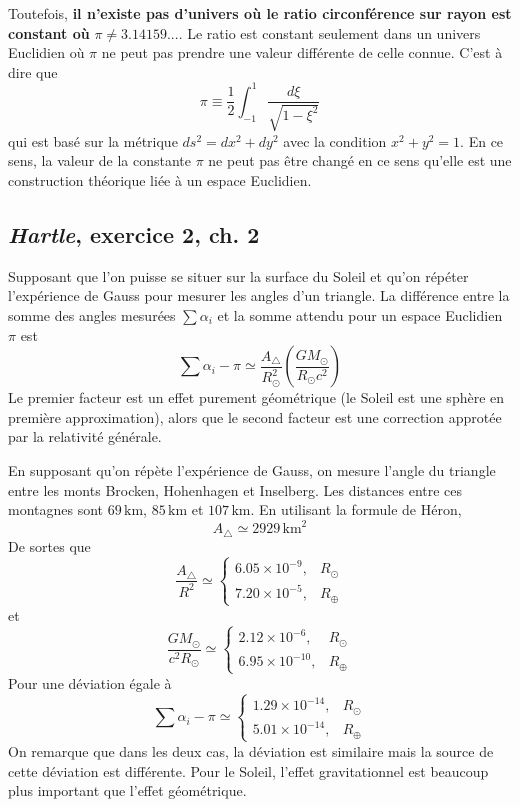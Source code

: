 \documentclass{article}
\numberwithin{equation}{section}
\begin{document}
Toutefois, \textbf{il n'existe pas d'univers où le ratio circonférence sur rayon est constant 
où} $\pi \not= 3.14159...$. Le ratio est constant seulement dans un univers Euclidien où 
$\pi$ ne peut pas prendre une valeur différente de celle connue. C'est à dire que 
\[
        \pi \equiv \frac{1}{2}\int_{-1}^1 \frac{d\xi}{\sqrt{1 - \xi^2}}
\]
qui est basé sur la métrique $ds^2 = dx^2 + dy^2$ 
avec la condition $x^2 + y^2 = 1$. En ce sens, la valeur de la constante $\pi$ ne peut pas être 
changé en ce sens qu'elle est une construction théorique liée à un espace Euclidien.

\subsection{\textit{Hartle}, exercice 2, ch. 2}
Supposant que l'on puisse se situer sur la surface du Soleil et qu'on répéter l'expérience 
de Gauss pour mesurer les angles d'un triangle. La différence entre la somme des angles 
mesurées $\sum \alpha_i$ et la somme attendu pour un espace Euclidien $\pi$ est 
\[
        \sum \alpha_i - \pi \simeq \frac{A_{\triangle}}{R_\odot^{2}} 
        \left( \frac{GM_\odot}{R_\odot c^2} \right)
\]
Le premier facteur est un effet purement géométrique (le Soleil est une sphère en première 
approximation), alors que le second facteur est une correction approtée par la relativité générale.

En supposant qu'on répète l'expérience de Gauss, on mesure l'angle du triangle entre les monts 
Brocken, Hohenhagen et Inselberg. Les distances entre ces montagnes sont $69\, \text{km}$, 
$85\, \text{km}$ et $107\, \text{km}$. En utilisant la formule de Héron, 
\[
        A_\triangle \simeq 2929\, \text{km}^2
\]
De sortes que
\[
        \frac{A_\triangle}{R^2} \simeq 
\left\{ 
\begin{matrix}
        6.05 \times 10^{-9}, & R_\odot \\
        7.20 \times 10^{-5}, & R_\oplus
\end{matrix}
\right.
\]
et
\[
        \frac{GM_\odot}{c^2R_\odot} \simeq 
\left\{ 
\begin{matrix}
        2.12 \times 10^{-6}, & R_\odot \\
        6.95 \times 10^{-10}, & R_\oplus
\end{matrix}
\right.
\]
Pour une déviation égale à
\[
        \sum \alpha_i - \pi \simeq 
\left\{ 
\begin{matrix}
        1.29 \times 10^{-14}, & R_\odot \\ 
        5.01 \times 10^{-14}, & R_\oplus
\end{matrix}
\right.
\]
On remarque que dans les deux cas, la déviation est similaire mais la source de cette déviation 
est différente. Pour le Soleil, l'effet gravitationnel est beaucoup plus important que l'effet géométrique.
\end{document}
